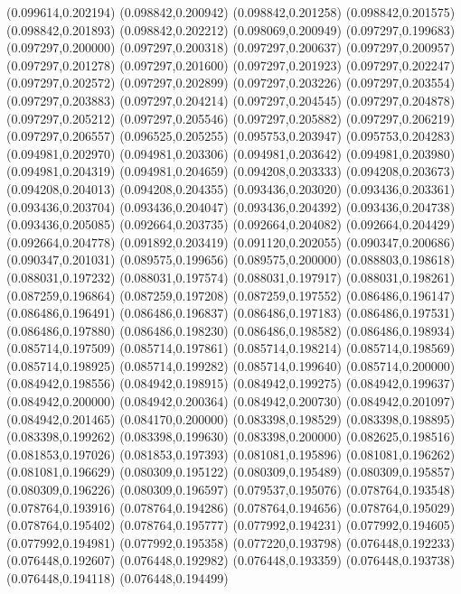 (0.099614,0.202194)
(0.098842,0.200942)
(0.098842,0.201258)
(0.098842,0.201575)
(0.098842,0.201893)
(0.098842,0.202212)
(0.098069,0.200949)
(0.097297,0.199683)
(0.097297,0.200000)
(0.097297,0.200318)
(0.097297,0.200637)
(0.097297,0.200957)
(0.097297,0.201278)
(0.097297,0.201600)
(0.097297,0.201923)
(0.097297,0.202247)
(0.097297,0.202572)
(0.097297,0.202899)
(0.097297,0.203226)
(0.097297,0.203554)
(0.097297,0.203883)
(0.097297,0.204214)
(0.097297,0.204545)
(0.097297,0.204878)
(0.097297,0.205212)
(0.097297,0.205546)
(0.097297,0.205882)
(0.097297,0.206219)
(0.097297,0.206557)
(0.096525,0.205255)
(0.095753,0.203947)
(0.095753,0.204283)
(0.094981,0.202970)
(0.094981,0.203306)
(0.094981,0.203642)
(0.094981,0.203980)
(0.094981,0.204319)
(0.094981,0.204659)
(0.094208,0.203333)
(0.094208,0.203673)
(0.094208,0.204013)
(0.094208,0.204355)
(0.093436,0.203020)
(0.093436,0.203361)
(0.093436,0.203704)
(0.093436,0.204047)
(0.093436,0.204392)
(0.093436,0.204738)
(0.093436,0.205085)
(0.092664,0.203735)
(0.092664,0.204082)
(0.092664,0.204429)
(0.092664,0.204778)
(0.091892,0.203419)
(0.091120,0.202055)
(0.090347,0.200686)
(0.090347,0.201031)
(0.089575,0.199656)
(0.089575,0.200000)
(0.088803,0.198618)
(0.088031,0.197232)
(0.088031,0.197574)
(0.088031,0.197917)
(0.088031,0.198261)
(0.087259,0.196864)
(0.087259,0.197208)
(0.087259,0.197552)
(0.086486,0.196147)
(0.086486,0.196491)
(0.086486,0.196837)
(0.086486,0.197183)
(0.086486,0.197531)
(0.086486,0.197880)
(0.086486,0.198230)
(0.086486,0.198582)
(0.086486,0.198934)
(0.085714,0.197509)
(0.085714,0.197861)
(0.085714,0.198214)
(0.085714,0.198569)
(0.085714,0.198925)
(0.085714,0.199282)
(0.085714,0.199640)
(0.085714,0.200000)
(0.084942,0.198556)
(0.084942,0.198915)
(0.084942,0.199275)
(0.084942,0.199637)
(0.084942,0.200000)
(0.084942,0.200364)
(0.084942,0.200730)
(0.084942,0.201097)
(0.084942,0.201465)
(0.084170,0.200000)
(0.083398,0.198529)
(0.083398,0.198895)
(0.083398,0.199262)
(0.083398,0.199630)
(0.083398,0.200000)
(0.082625,0.198516)
(0.081853,0.197026)
(0.081853,0.197393)
(0.081081,0.195896)
(0.081081,0.196262)
(0.081081,0.196629)
(0.080309,0.195122)
(0.080309,0.195489)
(0.080309,0.195857)
(0.080309,0.196226)
(0.080309,0.196597)
(0.079537,0.195076)
(0.078764,0.193548)
(0.078764,0.193916)
(0.078764,0.194286)
(0.078764,0.194656)
(0.078764,0.195029)
(0.078764,0.195402)
(0.078764,0.195777)
(0.077992,0.194231)
(0.077992,0.194605)
(0.077992,0.194981)
(0.077992,0.195358)
(0.077220,0.193798)
(0.076448,0.192233)
(0.076448,0.192607)
(0.076448,0.192982)
(0.076448,0.193359)
(0.076448,0.193738)
(0.076448,0.194118)
(0.076448,0.194499)
